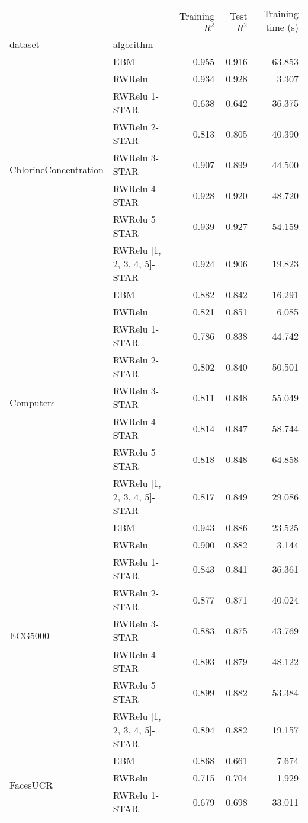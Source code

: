 \begin{tabular}{llrrr}
\toprule
 &  & Training $R^2$ & Test $R^2$ & Training time (s) \\
dataset & algorithm &  &  &  \\
\midrule
\multirow[t]{8}{*}{ChlorineConcentration} & EBM & 0.955 & 0.916 & 63.853 \\
 & RWRelu & 0.934 & 0.928 & 3.307 \\
 & RWRelu 1-STAR & 0.638 & 0.642 & 36.375 \\
 & RWRelu 2-STAR & 0.813 & 0.805 & 40.390 \\
 & RWRelu 3-STAR & 0.907 & 0.899 & 44.500 \\
 & RWRelu 4-STAR & 0.928 & 0.920 & 48.720 \\
 & RWRelu 5-STAR & 0.939 & 0.927 & 54.159 \\
 & RWRelu [1, 2, 3, 4, 5]-STAR & 0.924 & 0.906 & 19.823 \\
\cline{1-5}
\multirow[t]{8}{*}{Computers} & EBM & 0.882 & 0.842 & 16.291 \\
 & RWRelu & 0.821 & 0.851 & 6.085 \\
 & RWRelu 1-STAR & 0.786 & 0.838 & 44.742 \\
 & RWRelu 2-STAR & 0.802 & 0.840 & 50.501 \\
 & RWRelu 3-STAR & 0.811 & 0.848 & 55.049 \\
 & RWRelu 4-STAR & 0.814 & 0.847 & 58.744 \\
 & RWRelu 5-STAR & 0.818 & 0.848 & 64.858 \\
 & RWRelu [1, 2, 3, 4, 5]-STAR & 0.817 & 0.849 & 29.086 \\
\cline{1-5}
\multirow[t]{8}{*}{ECG5000} & EBM & 0.943 & 0.886 & 23.525 \\
 & RWRelu & 0.900 & 0.882 & 3.144 \\
 & RWRelu 1-STAR & 0.843 & 0.841 & 36.361 \\
 & RWRelu 2-STAR & 0.877 & 0.871 & 40.024 \\
 & RWRelu 3-STAR & 0.883 & 0.875 & 43.769 \\
 & RWRelu 4-STAR & 0.893 & 0.879 & 48.122 \\
 & RWRelu 5-STAR & 0.899 & 0.882 & 53.384 \\
 & RWRelu [1, 2, 3, 4, 5]-STAR & 0.894 & 0.882 & 19.157 \\
\cline{1-5}
\multirow[t]{8}{*}{FacesUCR} & EBM & 0.868 & 0.661 & 7.674 \\
 & RWRelu & 0.715 & 0.704 & 1.929 \\
 & RWRelu 1-STAR & 0.679 & 0.698 & 33.011 \\

\end{tabular}
